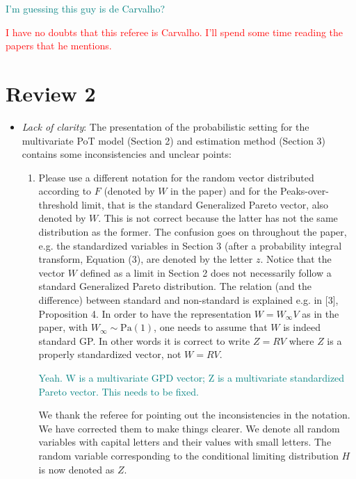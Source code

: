 \documentclass[10pt]{article}
\newcommand{\comment}[1]{\textcolor{teal}{#1}}
\newcommand{\bruno}[1]{\textcolor{red}{#1}}
\begin{document}
\begin{itemize}
    \comment{I'm guessing this guy is de Carvalho?}
    
    \bruno{I have no doubts that this referee is Carvalho. I'll spend some time reading the papers
    that he mentions.}
    
\end{itemize}

\section*{Review 2}
\begin{itemize}
    \item \emph{Lack of clarity}: The presentation of the probabilistic setting for the multivariate 
    PoT model (Section 2) and estimation method (Section 3) contains some inconsistencies and unclear
    points:
    \begin{enumerate}
        \item Please use a different notation for the random vector distributed according to $F$ 
        (denoted by $W$ in the paper) and for the Peaks-over-threshold limit, that is the standard
        Generalized Pareto vector, also denoted by $W$. This is not correct because the latter has 
        not the same distribution as the former. The confusion goes on throughout the paper, e.g. 
        the standardized variables in Section 3 (after a probability integral transform, Equation
        (3), are denoted by the letter $z$. Notice that the vector $W$ defined as a limit in Section 
        2 does not necessarily follow a standard Generalized Pareto distribution. The relation 
        (and the difference) between standard and non-standard is explained e.g. in [3], Proposition 4. 
        In order to have the representation $W = W_{\infty}V$ as in the paper, with 
        $W_{\infty} \sim \text{Pa}(1)$, one needs to assume that $W$ is indeed standard GP. In other 
        words it is correct to write $Z = RV$ where $Z$ is a properly standardized vector, not $W = RV$.

        \comment{Yeah.  W is a multivariate GPD vector; Z is a multivariate standardized Pareto vector.
        This needs to be fixed.}
        
        We thank the referee for pointing out the inconsistencies in the notation. We have corrected them 
        to make things clearer. We denote all random variables with capital letters and their values
        with small letters. The random variable corresponding to the conditional limiting distribution
        $H$ is now denoted as $Z$.


\end{enumerate}
\end{itemize}
\end{document}
